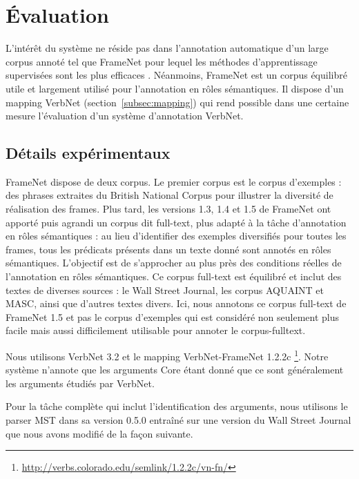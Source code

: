 \section{Évaluation}
\label{srl:evaluation}

L'intérêt du système ne réside pas dans l'annotation automatique d'un large
corpus annoté tel que FrameNet pour lequel les méthodes d'apprentissage
supervisées sont les plus efficaces \citep{das2014frame}. Néanmoins, FrameNet
est un corpus équilibré utile et largement utilisé pour l'annotation en rôles
sémantiques. Il dispose d'un mapping VerbNet (section~\ref{subsec:mapping}) qui
rend possible dans une certaine mesure l'évaluation d'un système d'annotation
VerbNet.

\subsection{Détails expérimentaux}
\label{subsec:details_exp}

FrameNet dispose de deux corpus. Le premier corpus est le corpus d'exemples :
des phrases extraites du British National Corpus pour illustrer la diversité de
réalisation des frames. Plus tard, les versions 1.3, 1.4 et 1.5 de FrameNet ont
apporté puis agrandi un corpus dit full-text, plus adapté à la tâche
d'annotation en rôles sémantiques : au lieu d'identifier des exemples
diversifiés pour toutes les frames, tous les prédicats présents dans un texte
donné sont annotés en rôles sémantiques. L'objectif est de s'approcher au plus
près des conditions réelles de l'annotation en rôles sémantiques. Ce corpus
full-text est équilibré et inclut des textes de diverses sources : le Wall
Street Journal, les corpus AQUAINT et MASC, ainsi que d'autres textes divers.
Ici, nous annotons ce corpus full-text de FrameNet 1.5 et pas le corpus
d'exemples qui est considéré non seulement plus facile mais aussi difficilement
utilisable pour annoter le corpus-fulltext.

Nous utilisons VerbNet 3.2 et le mapping VerbNet-FrameNet 1.2.2c
\footnote{\url{http://verbs.colorado.edu/semlink/1.2.2c/vn-fn/}}. Notre système
n'annote que les arguments Core étant donné que ce sont généralement les
arguments étudiés par VerbNet.

Pour la tâche complète qui inclut l'identification des arguments, nous
utilisons le parser MST dans sa version 0.5.0 \citep{mcdonald2006multilingual}
entraîné sur une version du Wall Street Journal que nous avons modifié de la
façon suivante.

